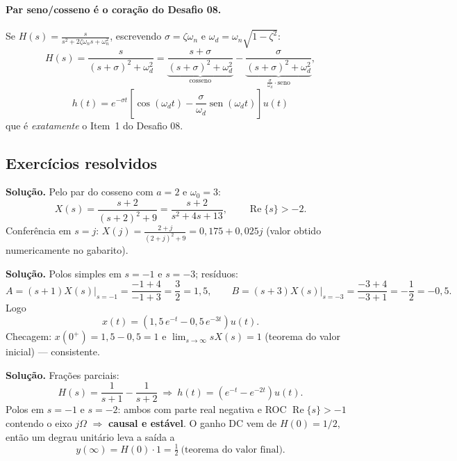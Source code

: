 \paragraph{Par seno/cosseno é o coração do Desafio 08.} Se
$H(s)=\frac{s}{s^2+2\zeta\omega_n s+\omega_n^2}$, escrevendo $\sigma=\zeta\omega_n$
e $\omega_d=\omega_n\sqrt{1-\zeta^2}$:
\[
  H(s)=\frac{s}{(s+\sigma)^2+\omega_d^2}
       =\underbrace{\frac{s+\sigma}{(s+\sigma)^2+\omega_d^2}}_{\text{cosseno}}
       -\underbrace{\frac{\sigma}{(s+\sigma)^2+\omega_d^2}}_{\frac{\sigma}{\omega_d}\cdot\text{seno}},
\]
\[
  \boxed{\ h(t)=e^{-\sigma t}\left[\cos(\omega_d t)-\frac{\sigma}{\omega_d}
  \operatorname{sen}(\omega_d t)\right]u(t)\ }
\]
que é \emph{exatamente} o Item~1 do Desafio 08.

\subsection*{Exercícios resolvidos}


\textbf{Solução.} Pelo par do cosseno com $a=2$ e $\omega_0=3$:
\[
  X(s)=\frac{s+2}{(s+2)^2+9}=\frac{s+2}{s^2+4s+13},\qquad \operatorname{Re}\{s\}>-2 .
\]
Conferência em $s=j$: $X(j)=\frac{2+j}{(2+j)^2+9}=0{,}175+0{,}025j$
(valor obtido numericamente no gabarito).



\textbf{Solução.} Polos simples em $s=-1$ e $s=-3$; resíduos:
\[
  A=(s+1)X(s)\Big|_{s=-1}=\frac{-1+4}{-1+3}=\frac{3}{2}=1{,}5,
  \qquad
  B=(s+3)X(s)\Big|_{s=-3}=\frac{-3+4}{-3+1}=-\frac{1}{2}=-0{,}5 .
\]
Logo
\[
  x(t)=\left(1{,}5\,e^{-t}-0{,}5\,e^{-3t}\right)u(t).
\]
Checagem: $x(0^+)=1{,}5-0{,}5=1$ e
$\lim_{s\to\infty}sX(s)=1$ (teorema do valor inicial) — consistente.



\textbf{Solução.} Frações parciais:
\[
  H(s)=\frac{1}{s+1}-\frac{1}{s+2}
  \ \Longrightarrow\
  h(t)=\left(e^{-t}-e^{-2t}\right)u(t).
\]
Polos em $s=-1$ e $s=-2$: ambos com parte real negativa e ROC
$\operatorname{Re}\{s\}>-1$ contendo o eixo $j\Omega$ $\Rightarrow$
\textbf{causal e estável}. O ganho DC vem de $H(0)=1/2$, então um degrau
unitário leva a saída a
\[
  y(\infty)=H(0)\cdot 1=\tfrac{1}{2}\ \text{(teorema do valor final)}.
\]

